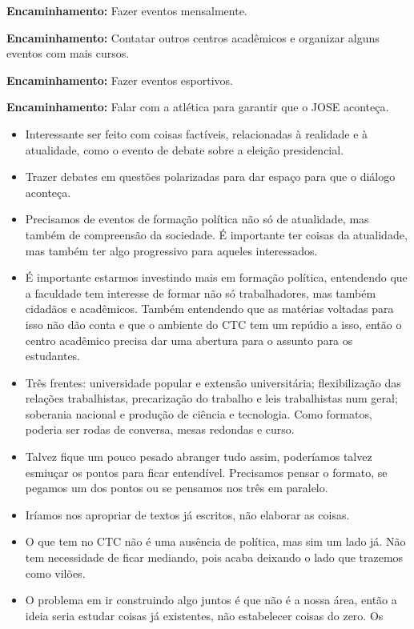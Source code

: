\documentclass{ata-calico}
\begin{document}
\textbf{Encaminhamento:} Fazer eventos mensalmente.

\textbf{Encaminhamento:} Contatar outros centros acadêmicos e organizar alguns eventos com mais cursos.

\textbf{Encaminhamento:} Fazer eventos esportivos.

\textbf{Encaminhamento:} Falar com a atlética para garantir que o JOSE aconteça.

\begin{itemize}
\item Interessante ser feito com coisas factíveis, relacionadas à realidade e à
  atualidade, como o evento de debate sobre a eleição presidencial.
\item Trazer debates em questões polarizadas para dar espaço para que o diálogo
  aconteça.
\item Precisamos de eventos de formação política não só de atualidade, mas também
  de compreensão da sociedade. É importante ter coisas da atualidade, mas
  também ter algo progressivo para aqueles interessados.
\item É importante estarmos investindo mais em formação política, entendendo que a
  faculdade tem interesse de formar não só trabalhadores, mas também cidadãos e
  acadêmicos. Também entendendo que as matérias voltadas para isso não dão
  conta e que o ambiente do CTC tem um repúdio a isso, então o centro acadêmico
  precisa dar uma abertura para o assunto para os estudantes.
\item Três frentes: universidade popular e extensão universitária; flexibilização
  das relações trabalhistas, precarização do trabalho e leis trabalhistas num
  geral; soberania nacional e produção de ciência e tecnologia. Como formatos,
  poderia ser rodas de conversa, mesas redondas e curso.
\item Talvez fique um pouco pesado abranger tudo assim, poderíamos talvez esmiuçar
  os pontos para ficar entendível. Precisamos pensar o formato, se pegamos um
  dos pontos ou se pensamos nos três em paralelo.
\item Iríamos nos apropriar de textos já escritos, não elaborar as coisas.
\item O que tem no CTC não é uma ausência de política, mas sim um lado já. Não tem
  necessidade de ficar mediando, pois acaba deixando o lado que trazemos
  como vilões.
\item O problema em ir construindo algo juntos é que não é a nossa área, então a
  ideia seria estudar coisas já existentes, não estabelecer coisas do zero. Os

\end{itemize}
\end{document}
